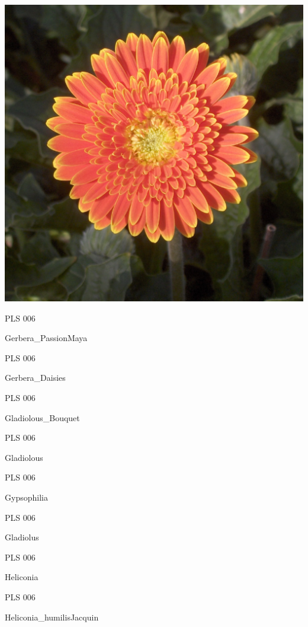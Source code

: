 \documentclass{article}
\begin{document}
\begin{center}
\includegraphics[height=0.925\paperheight]{../Gerbera.jpg}
\end{center}
\newpage

\noindent  PLS 006
\vfill
\centerline{{\huge Gerbera\_PassionMaya }}
\vfill
\newpage

\noindent  PLS 006
\vfill
\centerline{{\huge Gerbera\_Daisies }}
\vfill
\newpage

\noindent  PLS 006
\vfill
\centerline{{\huge Gladiolous\_Bouquet }}
\vfill
\newpage

\noindent  PLS 006
\vfill
\centerline{{\huge Gladiolous }}
\vfill
\newpage

\noindent  PLS 006
\vfill
\centerline{{\huge Gypsophilia }}
\vfill
\newpage

\noindent  PLS 006
\vfill
\centerline{{\huge Gladiolus }}
\vfill
\newpage

\noindent  PLS 006
\vfill
\centerline{{\huge Heliconia }}
\vfill
\newpage

\noindent  PLS 006
\vfill
\centerline{{\huge Heliconia\_humilisJacquin }}
\vfill
\newpage
\end{document}
